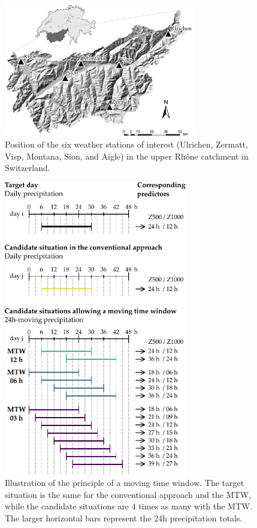 \documentclass[hess, manuscript]{copernicus}
\begin{document}
	
	
	
	
	
	
	
	
	
	\begin{figure}[htb]
		\begin{center}
			\includegraphics[width=8.3cm]{fig01.pdf}
		\end{center}
		\caption{Position of the six weather stations of interest (Ulrichen, Zermatt, Visp, Montana, Sion, and Aigle) in the upper Rh\^{o}ne catchment in Switzerland.}
		\label{fig:map}
	\end{figure}
	
	\begin{figure}[htb]
		\begin{center}
			\includegraphics[width=8cm]{fig02.pdf}
		\end{center}
		\caption{Illustration of the principle of a moving time window. The target situation is the same for the conventional approach and the MTW, while the candidate situations are 4 times as many with the MTW. The larger horizontal bars represent the 24h precipitation totals.}
		\label{fig:principle}
	\end{figure}
	
\end{document}
